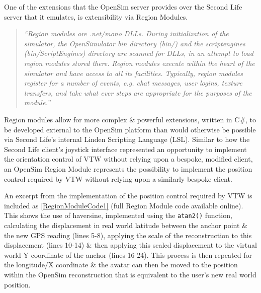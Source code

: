
One of the extensions that the OpenSim server provides over the Second Life server that it emulates, is extensibility via Region Modules.

\begin{quotation}
	\textit{``Region modules are .net/mono DLLs. During initialization of the simulator, the OpenSimulator bin directory (bin/) and the scriptengines (bin/ScriptEngines) directory are scanned for DLLs, in an attempt to load region modules stored there. Region modules execute within the heart of the simulator and have access to all its facilities. Typically, region modules register for a number of events, e.g. chat messages, user logins, texture transfers, and take what ever steps are appropriate for the purposes of the module.''}\RegionModuleFootnote{}
\end{quotation}

Region modules allow for more complex \& powerful extensions, written in C\#, to be developed external to the OpenSim platform than would otherwise be possible via Second Life's internal Linden Scripting Language (LSL). Similar to how the Second Life client's joystick interface represented an opportunity to implement the orientation control of VTW without relying upon a bespoke, modified client, an OpenSim Region Module represents the possibility to implement the position control required by VTW without relying upon a similarly bespoke client.

An excerpt from the implementation of the position control required by VTW is included as \ref{RegionModuleCode1} (full Region Module code available online\RegionModuleCodeFootnote{}). This shows the use of haversine, implemented using the \texttt{atan2()} function, calculating the displacement in real world latitude between the anchor point \& the new GPS reading (lines 5-8), applying the scale of the reconstruction to this displacement (lines 10-14) \& then applying this scaled displacement to the virtual world Y coordinate of the anchor (lines 16-24). This process is then repeated for the longitude/X coordinate \& the avatar can then be moved to the position within the OpenSim reconstruction that is equivalent to the user's new real world position.

